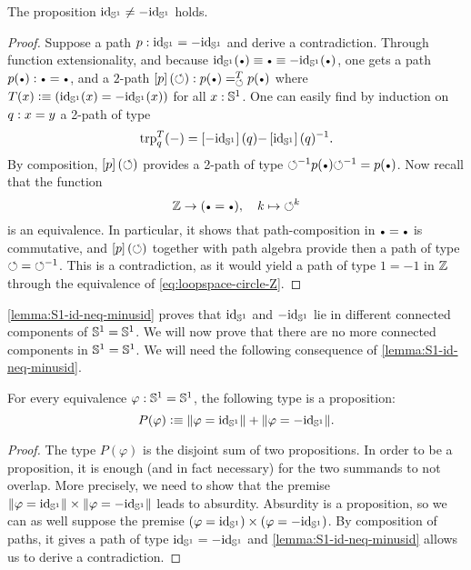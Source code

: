 \documentclass[english,a4paper]{lmcs}
\begin{document}
\begin{lem}
  \label{lemma:S1-id-neq-minusid}%
  The proposition $\id_\Sc \neq -\id_\Sc$ holds.
\end{lem}
\begin{proof}
  Suppose a path $p\from\id_\Sc = -\id_\Sc$ and derive a
  contradiction. Through function extensionality, and because
  $\id_\Sc(\base) \jdeq \base \jdeq -\id_\Sc(\base)$, one gets a path
  $p(\base) \from \base = \base$, and a $2$-path
  $\ap p (\Sloop) \from \pathover {p(\base)} T \Sloop {p(\base)}$ where
  $T(x)\defequi (\id_\Sc(x) = -\id_\Sc(x))$ for all $x:\Sc$. One can
  easily find by induction on $q\from x=y$ a 2-path of type
  \begin{displaymath}
    \trp [T] q (\blank) = \ap{-\id_\Sc}(q) \blank \inv{\ap{\id_\Sc}(q)}.
  \end{displaymath}
  By composition, $\ap p (\Sloop)$ provides a 2-path of type
  $\inv\Sloop p(\base) \inv\Sloop = p(\base)$. Now recall that
  the function
  \begin{equation}
    \label{eq:loopspace-circle-Z}%
    \ZZ\to(\base=\base),\quad k \mapsto \Sloop^k
  \end{equation}
  is an equivalence. In particular, it shows that path-composition in
  $\base=\base$ is commutative, and $\ap p (\Sloop)$ together with
  path algebra provide then a path of type $\Sloop = \inv\Sloop$. This
  is a contradiction, as it would yield a path of type $1=-1$ in $\ZZ$
  through the equivalence of \cref{eq:loopspace-circle-Z}.
\end{proof}
\cref{lemma:S1-id-neq-minusid} proves that $\id_\Sc$ and $-\id_\Sc$
lie in different connected components of $\Sc=\Sc$. We will now prove
that there are no more connected components in $\Sc=\Sc$. We will need
the following consequence of \cref{lemma:S1-id-neq-minusid}.
\begin{cor}%
  \label{cor:S1-eq-either-isaprop}%
  For every equivalence $\varphi\from \Sc=\Sc$, the following type is
  a proposition:
  \begin{equation}
    \label{eq:S1-def-target-eq}%
    P(\varphi) \defequi \Trunc{\varphi = \id_\Sc} + \Trunc{\varphi = -\id_\Sc}.
  \end{equation}
\end{cor}
\begin{proof}
  The type $P(\varphi)$ is the disjoint sum of two propositions. In
  order to be a proposition, it is enough (and in fact necessary) for
  the two summands to not overlap. More precisely, we need to show
  that the premise
  $\Trunc{\varphi = \id_\Sc}\times\Trunc{\varphi = -\id_\Sc}$ leads to
  absurdity. Absurdity is a proposition, so we can as well suppose the
  premise ${(\varphi = \id_\Sc)}\times{(\varphi = -\id_\Sc)}$. By
  composition of paths, it gives a path of type $\id_\Sc = -\id_\Sc$
  and \cref{lemma:S1-id-neq-minusid} allows us to derive a
  contradiction.
\end{proof}
\end{document}
